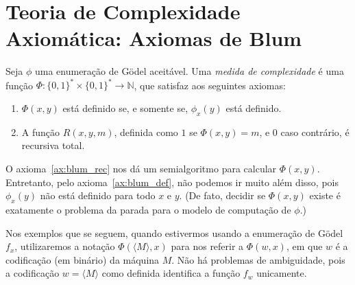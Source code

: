 \section{Teoria de Complexidade Axiomática: Axiomas de Blum}
\label{sec:blum_axioms}

\begin{definition}
    Seja $\phi$ uma enumeração de Gödel aceitável.
    Uma \emph{medida de complexidade} é uma função
    $\Phi: \{0, 1\}^* \times \{0, 1\}^* \to \mathbb N$,
    que satisfaz aos seguintes axiomas:\footnotemark
    \begin{enumerate} [label=\textbf{Axioma \arabic*}, ref=\arabic*, align=left]
        \item
            \label{ax:blum_def}
            $\Phi(x, y)$ está definido
            se, e somente se,
            $\phi_x(y)$ está definido.
        \item
            \label{ax:blum_rec}
            A função $R(x, y, m)$,
            definida como $1$ se $\Phi(x, y) = m$,
            e $0$ caso contrário,
            é recursiva total.
    \end{enumerate}

\end{definition}

O axioma~\ref{ax:blum_rec}
nos dá um semialgoritmo para calcular $\Phi(x, y)$.
Entretanto, pelo axioma~\ref{ax:blum_def},
não podemos ir muito além disso,
pois $\phi_x(y)$ não está definido para todo $x$ e $y$.
(De fato, decidir se $\Phi(x, y)$ existe
é exatamente o problema da parada para o modelo de computação de $\phi$.)

Nos exemplos que se seguem,
quando estivermos usando a enumeração de Gödel $f_x$,
utilizaremos a notação $\Phi(\langle M \rangle, x)$
para nos referir a $\Phi(w, x)$,
em que $w$ é a codificação (em binário) da máquina $M$.
Não há problemas de ambiguidade,
pois a codificação $w = \langle M \rangle$ como definida
identifica a função $f_w$ unicamente.

